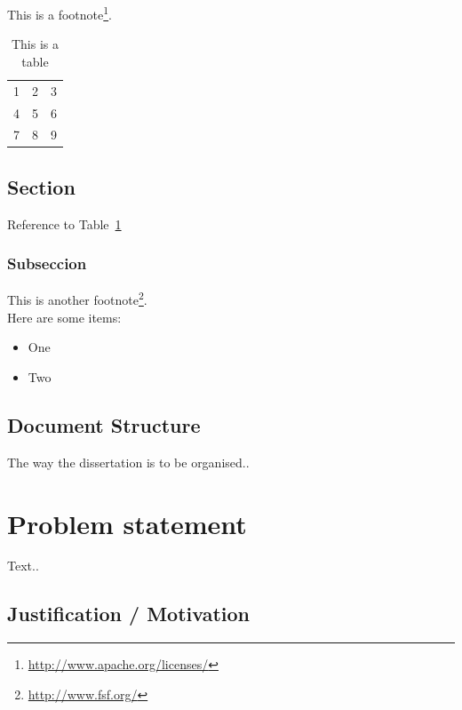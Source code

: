 \documentclass[a4paper, 12pt]{book}
\begin{document}
This is a footnote\footnote{\url{http://www.apache.org/licenses/}}.

\begin{table}
  \centering
  \begin{tabular}{ | l | c | r | }
    \hline
    1 & 2 & 3 \\
    4 & 5 & 6 \\
    7 & 8 & 9 \\
    \hline
  \end{tabular}  
  \caption{This is a table}
  \label{table:tablename}
\end{table}

\section{Section}
\label{sec:section}

Reference to Table~\ref{table:tablename} 

	\subsection{Subseccion}
	\label{subsec:subsection}

This is another footnote\footnote{\url{http://www.fsf.org/}}.\\

Here are some items:

\begin{itemize}
	\item One
	\item Two
\end{itemize}

\section{Document Structure}
\label{sec:structure}

The way the dissertation is to be organised..


%
\chapter{Problem statement}
\label{chap:problem}

Text..

\section{Justification / Motivation}
\label{sec:justification}
\end{document}
